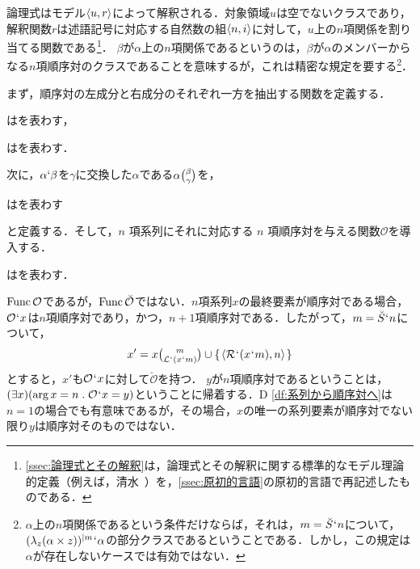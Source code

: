 論理式はモデル$\langle u,r \rangle$によって解釈される．対象領域$u$は空でないクラスであり，解釈関数$r$は述語記号に対応する自然数の組$\langle n,i \rangle$に対して，$ u $上の$ n $項関係を割り当てる関数である\footnote{
    \ref{ssec:論理式とその解釈}は，論理式とその解釈に関する標準的なモデル理論的定義（例えば，清水~\cite[pp.103-107]{清水}）を，\ref{ssec:原初的言語}の原初的言語で再記述したものである．
}．
$\beta$が$\alpha$上の$n$項関係であるというのは，$\beta$が$\alpha$のメンバーからなる$n$項順序対のクラスであることを意味するが，これは精密な規定を要する\footnote{
    $\alpha$上の$n$項関係であるという条件だけならば，それは，$m=\breve{S}{\mspace{1mu}{`}\mspace{1mu}} n$について，$ (\lambda_z(\alpha\times z))^{\mid m}{\mspace{1mu}{`}\mspace{1mu}} \alpha $の部分クラスであるということである．しかし，この規定は$\alpha$が存在しないケースでは有効ではない．
}．

まず，順序対の左成分と右成分のそれぞれ一方を抽出する関数を定義する．
\begin{df}
\label{df:左成分}
はを表わす，
\end{df}

\begin{df}
\label{df:右成分}
はを表わす．
\end{df}

\noindent 次に，$\alpha{`}\beta$を$\gamma$に交換した$\alpha$である$ \alpha \tbinom{\beta}{\gamma} $を，
\begin{df}
\label{df:系列要素の変換}
\kagi{$
    \alpha\tbinom{\beta}{\gamma}
$}は\kagi{$
    (\alpha\uphr\barl{\classab{\beta}})\cup\classab{\orp{\gamma,\beta}}
$}を表わす
\end{df}
\noindent と定義する．そして，$ n $ 項系列にそれに対応する $ n $ 項順序対を与える関数$ \mathcal{O} $を導入する．

\begin{df}
\label{df:系列から順序対へ}
はを表わす．
\end{df}

\noindent $\operatorname{Func}{\mathcal{O}}$であるが，$\operatorname{Func}{\breve{\mathcal{O}}}$ではない．$n$項系列$x$の最終要素が順序対である場合，$\mathcal{O}{\mspace{1mu}{`}\mspace{1mu}} x$は$n$項順序対であり，かつ，$n+1$項順序対である．したがって，$m=\breve{S}{\mspace{1mu}{`}\mspace{1mu}} n$について，
\[
    x'= x\tbinom{m}{\mathcal{L}{\mspace{1mu}{`}\mspace{1mu}}(x{\mspace{1mu}{`}\mspace{1mu}} m)}\cup\{\mspace{2mu}\langle \mathcal{R}{\mspace{1mu}{`}\mspace{1mu}}(x{\mspace{1mu}{`}\mspace{1mu}} m),n \rangle\mspace{2mu}\}
\]
とすると，$x'$も$\mathcal{O}{\mspace{1mu}{`}\mspace{1mu}} x$に対して$\breve{\mathcal{O}}$を持つ．
$y$が$n$項順序対であるということは，$(\exists x)(\arg{x}=n\con{1}\mathcal{O}\fap x=y)$ということに帰着する．D \ref{df:系列から順序対へ}は$n=1$の場合でも有意味であるが，その場合，$x$の唯一の系列要素が順序対でない限り$y$は順序対そのものではない．

